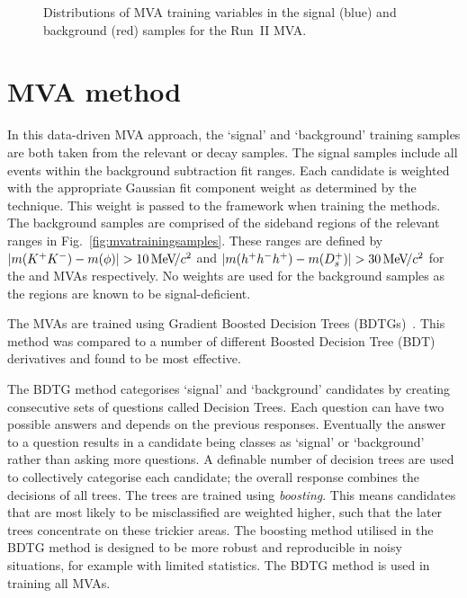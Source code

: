 \begin{figure}[!h]
\begin{subfigure}[t]{0.22\textwidth}
   \end{subfigure}
   \caption{Distributions of MVA training variables in the signal (blue) and background (red) samples for the Run~II \decay{\Dsp}{\Kp\Km\pip} MVA.}
   \label{fig:mvatrainingvariables_Ds}   
\end{figure}

\clearpage
\section{MVA method}
\label{sec:app_mva_method}


In this data-driven MVA approach, the `signal' and `background' training samples are both taken from the relevant \decay{\Bsb}{\Dsp\pim} or \decay{\Bs}{\jpsi\phiz} decay samples.
The signal samples include all events within the background subtraction fit ranges. Each candidate is weighted with the appropriate Gaussian fit component weight as determined by the \sPlot technique. This weight is passed to the \tmva framework when training the methods.
The background samples are comprised of the sideband regions of the relevant ranges in Fig.~\ref{fig:mvatrainingsamples}. These ranges are defined by $|m({{K}^+}{{K}^-})-m(\phi)| > 10 {\mathrm{\,Me\kern -0.1em V\!/}c^2}$ and $|m(h^{+}h^{-}h^{+})-m({{D}^+_{s}})| > 30{\mathrm{\,Me\kern -0.1em V\!/}c^2}$ for the \phiz and \Dsp MVAs respectively. No weights are used for the background samples as the regions are known to be signal-deficient.



The MVAs are trained using Gradient Boosted Decision Trees (BDTGs)~\cite{Breiman}. This method was compared to a number of different Boosted Decision Tree (BDT) derivatives and found to be most effective.

The BDTG method categorises `signal' and `background' candidates by creating consecutive sets of questions called Decision Trees. Each question can have two possible answers and depends on the previous responses. Eventually the answer to a question results in a candidate being classes as `signal' or `background' rather than asking more questions. A definable number of decision trees are used to collectively categorise each candidate; the overall response combines the decisions of all trees. The trees are trained using \emph{boosting}. This means candidates that are most likely to be misclassified are weighted higher, such that the later trees concentrate on these trickier areas.  
The boosting method utilised in the BDTG method is designed to be more robust and reproducible in noisy situations, for example with limited statistics. 
The BDTG method is used in training all MVAs.


